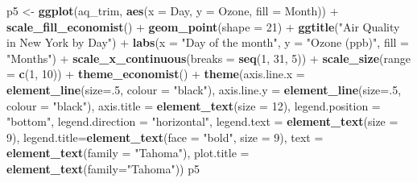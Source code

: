 \documentclass[]{article}
\newenvironment{Shaded}{\begin{snugshade}}{\end{snugshade}}
\newcommand{\KeywordTok}[1]{\textcolor[rgb]{0.13,0.29,0.53}{\textbf{{#1}}}}
\newcommand{\DataTypeTok}[1]{\textcolor[rgb]{0.13,0.29,0.53}{{#1}}}
\newcommand{\DecValTok}[1]{\textcolor[rgb]{0.00,0.00,0.81}{{#1}}}
\newcommand{\StringTok}[1]{\textcolor[rgb]{0.31,0.60,0.02}{{#1}}}
\newcommand{\NormalTok}[1]{{#1}}
\begin{document}
\begin{Shaded}
\begin{Highlighting}[]
\NormalTok{p5 <-}\StringTok{ }\KeywordTok{ggplot}\NormalTok{(aq_trim, }\KeywordTok{aes}\NormalTok{(}\DataTypeTok{x =} \NormalTok{Day, }\DataTypeTok{y =} \NormalTok{Ozone, }\DataTypeTok{fill =} \NormalTok{Month)) +}
\StringTok{      }\KeywordTok{scale_fill_economist}\NormalTok{() +}
\StringTok{      }\KeywordTok{geom_point}\NormalTok{(}\DataTypeTok{shape =} \DecValTok{21}\NormalTok{) +}
\StringTok{      }\KeywordTok{ggtitle}\NormalTok{(}\StringTok{"Air Quality in New York by Day"}\NormalTok{) +}\StringTok{ }
\StringTok{      }\KeywordTok{labs}\NormalTok{(}\DataTypeTok{x =} \StringTok{"Day of the month"}\NormalTok{, }\DataTypeTok{y =} \StringTok{"Ozone (ppb)"}\NormalTok{, }\DataTypeTok{fill =} \StringTok{"Months"}\NormalTok{) +}
\StringTok{      }\KeywordTok{scale_x_continuous}\NormalTok{(}\DataTypeTok{breaks =} \KeywordTok{seq}\NormalTok{(}\DecValTok{1}\NormalTok{, }\DecValTok{31}\NormalTok{, }\DecValTok{5}\NormalTok{)) +}
\StringTok{      }\KeywordTok{scale_size}\NormalTok{(}\DataTypeTok{range =} \KeywordTok{c}\NormalTok{(}\DecValTok{1}\NormalTok{, }\DecValTok{10}\NormalTok{)) +}
\StringTok{      }\KeywordTok{theme_economist}\NormalTok{() +}\StringTok{ }
\StringTok{      }\KeywordTok{theme}\NormalTok{(}\DataTypeTok{axis.line.x =} \KeywordTok{element_line}\NormalTok{(}\DataTypeTok{size=}\NormalTok{.}\DecValTok{5}\NormalTok{, }\DataTypeTok{colour =} \StringTok{"black"}\NormalTok{), }
            \DataTypeTok{axis.line.y =} \KeywordTok{element_line}\NormalTok{(}\DataTypeTok{size=}\NormalTok{.}\DecValTok{5}\NormalTok{, }\DataTypeTok{colour =} \StringTok{"black"}\NormalTok{), }
            \DataTypeTok{axis.title =} \KeywordTok{element_text}\NormalTok{(}\DataTypeTok{size =} \DecValTok{12}\NormalTok{),}
            \DataTypeTok{legend.position =} \StringTok{"bottom"}\NormalTok{, }\DataTypeTok{legend.direction =} \StringTok{"horizontal"}\NormalTok{,}
            \DataTypeTok{legend.text =} \KeywordTok{element_text}\NormalTok{(}\DataTypeTok{size =} \DecValTok{9}\NormalTok{),}
            \DataTypeTok{legend.title=}\KeywordTok{element_text}\NormalTok{(}\DataTypeTok{face =} \StringTok{"bold"}\NormalTok{, }\DataTypeTok{size =} \DecValTok{9}\NormalTok{),}
            \DataTypeTok{text =} \KeywordTok{element_text}\NormalTok{(}\DataTypeTok{family =} \StringTok{"Tahoma"}\NormalTok{),  }
            \DataTypeTok{plot.title =} \KeywordTok{element_text}\NormalTok{(}\DataTypeTok{family=}\StringTok{"Tahoma"}\NormalTok{))}
\NormalTok{p5}
\end{Highlighting}
\end{Shaded}
\end{document}
